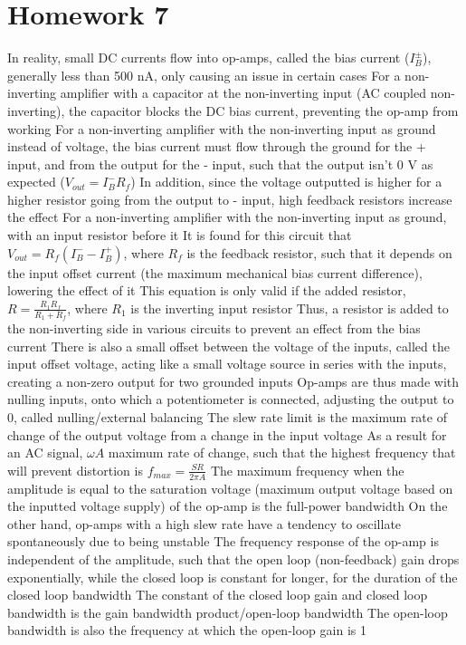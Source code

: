 \documentclass[11 pt, twoside]{article}
\newenvironment{outline*}
{
	\begin{outline}[enumerate]
	}
	{\end{outline}
}
\begin{document}
\section{Homework 7}
\begin{outline*}
\1 In reality, small DC currents flow into op-amps, called the bias current ($I_B^{\pm}$), generally less than 500 nA, only causing an issue in certain cases
	\2 For a non-inverting amplifier with a capacitor at the non-inverting input (AC coupled non-inverting), the capacitor blocks the DC bias current, preventing the op-amp from working
	\2 For a non-inverting amplifier with the non-inverting input as ground instead of voltage, the bias current must flow through the ground for the + input, and from the output for the - input, such that the output isn't 0 V as expected ($V_{out} = I_B^-R_f$)
		\3 In addition, since the voltage outputted is higher for a higher resistor going from the output to - input, high feedback resistors increase the effect
	\2 For a non-inverting amplifier with the non-inverting input as ground, with an input resistor before it
		\3 It is found for this circuit that $V_{out} = R_f(I_B^- - I_B^+)$, where $R_f$ is the feedback resistor, such that it depends on the input offset current (the maximum mechanical bias current difference), lowering the effect of it
			\4 This equation is only valid if the added resistor, $R = \frac{R_1R_f}{R_1 + R_f}$, where $R_1$ is the inverting input resistor
		\3 Thus, a resistor is added to the non-inverting side in various circuits to prevent an effect from the bias current
\1 There is also a small offset between the voltage of the inputs, called the input offset voltage, acting like a small voltage source in series with the inputs, creating a non-zero output for two grounded inputs
	\2 Op-amps are thus made with nulling inputs, onto which a potentiometer is connected, adjusting the output to 0, called nulling/external balancing
\1 The slew rate limit is the maximum rate of change of the output voltage from a change in the input voltage
	\2 As a result for an AC signal, $\omega A$ maximum rate of change, such that the highest frequency that will prevent distortion is $f_{max} = \frac{SR}{2\pi A}$
	\2 The maximum frequency when the amplitude is equal to the saturation voltage (maximum output voltage based on the inputted voltage supply) of the op-amp is the full-power bandwidth
	\2 On the other hand, op-amps with a high slew rate have a tendency to oscillate spontaneously due to being unstable
\1 The frequency response of the op-amp is independent of the amplitude, such that the open loop (non-feedback) gain drops exponentially, while the closed loop is constant for longer, for the duration of the closed loop bandwidth
	\2 The constant of the closed loop gain and closed loop bandwidth is the gain bandwidth product/open-loop bandwidth
		\3 The open-loop bandwidth is also the frequency at which the open-loop gain is 1 
\end{outline*}
\end{document}
